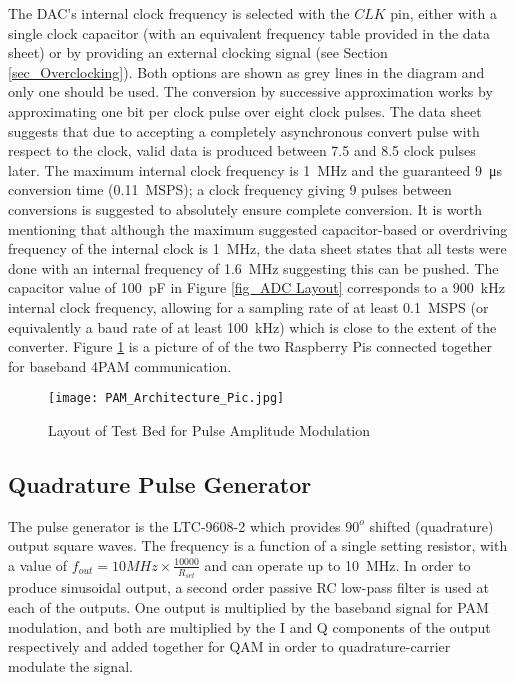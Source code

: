 \documentclass[../main.tex]{subfiles}
\begin{document}
The DAC's internal clock frequency is selected with the $CLK$ pin, either with a single clock capacitor (with an equivalent frequency table provided in the data sheet) or by providing an external clocking signal (see Section \ref{sec_Overclocking}).
Both options are shown as grey lines in the diagram and only one should be used.
The conversion by successive approximation works by approximating one bit per clock pulse over eight clock pulses.
The data sheet suggests that due to accepting a completely asynchronous convert pulse with respect to the clock, valid data is produced between 7.5 and 8.5 clock pulses later.
The maximum internal clock frequency is \SI{1}{\mega\hertz} and the guaranteed \SI{9}{\micro\second} conversion time (\SI{0.11}{MSPS}); a clock frequency giving 9 pulses between conversions is suggested to absolutely ensure complete conversion.
It is worth mentioning that although the maximum suggested capacitor-based or overdriving frequency of the internal clock is \SI{1}{\mega\hertz}, the data sheet states that all tests were done with an internal frequency of \SI{1.6}{\mega\hertz} suggesting this can be pushed.
The capacitor value of \SI{100}{\pico\farad} in Figure \ref{fig_ADC Layout} corresponds to a \SI{900}{\kilo\hertz} internal clock frequency, allowing for a sampling rate of at least \SI{0.1}{MSPS} %
(or equivalently a baud rate of at least \SI{100}{\kilo\hertz}) which is close to the extent of the converter.
Figure \ref{fig_PAM Architecture} is a picture of of the two Raspberry Pis connected together for baseband 4PAM communication.\\

\begin{figure}[ht]
	\centering
	\texttt{[image: PAM\_Architecture\_Pic.jpg]}
	\caption{Layout of Test Bed for Pulse Amplitude Modulation}
	\label{fig_PAM Architecture}
\end{figure}

\subsection{Quadrature Pulse Generator}

The pulse generator is the LTC-9608-2 which provides $90^o$ shifted (quadrature) output square waves.
The frequency is a function of a single setting resistor, with a value of $f_{out} = 10MHz \times \frac{10000}{R_{set}}$ and can operate up to \SI{10}{\mega\hertz}.
In order to produce sinusoidal output, a second order passive RC low-pass filter is used at each of the outputs.
One output is multiplied by the baseband signal for PAM modulation, and both are multiplied by the I and Q components of the output respectively and added together for QAM in order to quadrature-carrier modulate the signal.
\end{document}
